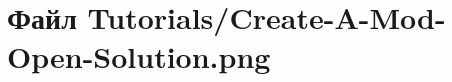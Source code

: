 \hypertarget{_create-_a-_mod-_open-_solution_8png}{}\section{Файл Tutorials/\+Create-\/\+A-\/\+Mod-\/\+Open-\/\+Solution.png}
\label{_create-_a-_mod-_open-_solution_8png}
